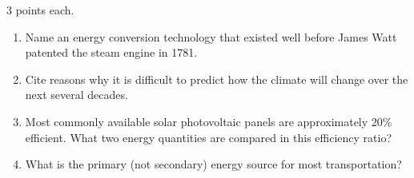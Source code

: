 \documentclass[12pt, oneside]{article}
\begin{document}
%
%
\newpage
{}
%
%
3 points each.

\begin{enumerate}


\item Name an energy conversion technology that existed well before
James Watt patented the steam engine in 1781.


\vfill


\item Cite reasons why it is difficult to predict how the climate will change
over the next several decades.


\vfill


\item Most commonly available solar photovoltaic panels are approximately 20\%
efficient.  What two energy quantities are compared in this efficiency
ratio?


\vfill


\item What is the primary (not secondary) energy source for most transportation?


\vfill

%
%
%
%


\end{enumerate}
\end{document}
